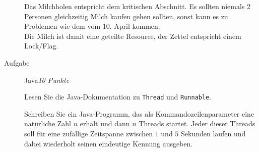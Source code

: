 \documentclass[a4paper,twoside,12pt]{article}
\newcounter{AUFGNR}
\newcommand{\AUFGABE}[2]{\vspace{0.3cm}\item[Aufgabe~\arabic{AUFGNR}]\stepcounter{AUFGNR} #1\hfill\emph{#2}}
\begin{document}
\begin{description}
Das Milchholen entspricht dem kritischen Abschnitt. Es sollten niemals 2 Personen gleichzeitig
Milch kaufen gehen sollten, sonst kann es zu Problemen wie dem vom 10. April kommen.\\
Die Milch ist damit eine geteilte Resource, der Zettel entspricht einem Lock/Flag.

\AUFGABE{Java}{10 Punkte}

Lesen Sie die Java-Dokumentation zu \texttt{Thread}
und \texttt{Runnable}.

Schreiben Sie ein Java-Programm, das als Kommandozeilenparameter eine
nat\"urliche Zahl $n$ erh\"alt und dann $n$ Threads startet.
Jeder dieser Threads soll f\"ur eine zuf\"allige Zeitspanne zwischen
$1$ und $5$ Sekunden laufen und dabei wiederholt seinen eindeutige
Kennung ausgeben.
\end{description}
\end{document}
